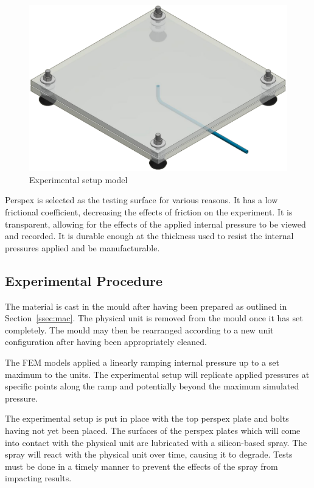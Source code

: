 \begin{figure}[H]
	\centering
	\includegraphics[width=\textwidth]{ER.png}
	\caption{Experimental setup model}
	\label{fig:exp}
\end{figure}

Perspex is selected as the testing surface for various reasons. It has a low frictional coefficient, decreasing the effects of friction on the experiment. It is transparent, allowing for the effects of the applied internal pressure to be viewed and recorded. It is durable enough at the thickness used to resist the internal pressures applied and be manufacturable.

\subsection{Experimental Procedure}

The material is cast in the mould after having been prepared as outlined in Section~\ref{ssec:mac}. The physical unit is removed from the mould once it has set completely. The mould may then be rearranged according to a new unit configuration after having been appropriately cleaned.

The FEM models applied a linearly ramping internal pressure up to a set maximum to the units. The experimental setup will replicate applied pressures at specific points along the ramp and potentially beyond the maximum simulated pressure.

The experimental setup is put in place with the top perspex plate and bolts having not yet been placed. The surfaces of the perspex plates which will come into contact with the physical unit are lubricated with a silicon-based spray. The spray will react with the physical unit over time, causing it to degrade. Tests must be done in a timely manner to prevent the effects of the spray from impacting results.

